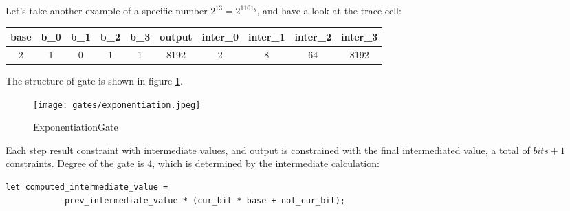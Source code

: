 Let's take another example of a specific number $2^13 = 2^{1101_b}$, and have a look at the trace cell:
\begin{center}
    \begin{tabular}{ |c|c|c|c|c|c|c|c|c|c| }
        \hline
        base & b\_0 & b\_1 & b\_2 & b\_3 & output & inter\_0 & inter\_1 & inter\_2 & inter\_3 \\
        \hline
        2 & 1 & 0 & 1 & 1 & 8192 & 2 & 8 & 64 & 8192 \\
        \hline
    \end{tabular}
\end{center}

The structure of gate is shown in figure \ref{fig:exponetiation-gate}.
\begin{figure}[!ht]
    \centering
    \texttt{[image: gates/exponentiation.jpeg]}
    \caption{ExponentiationGate}
    \label{fig:exponetiation-gate}
\end{figure}

Each step result constraint with intermediate values, and output is constrained with the final intermediated value, a total of $bits + 1$ constraints.
Degree of the gate is 4, which is determined by the intermediate calculation:
\begin{lstlisting}
let computed_intermediate_value =
            prev_intermediate_value * (cur_bit * base + not_cur_bit);
\end{lstlisting}
